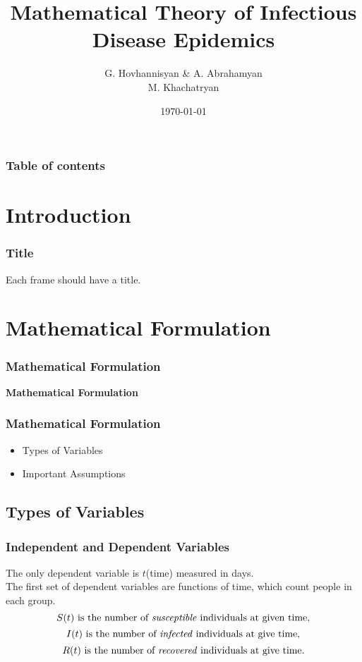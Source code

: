 \documentclass{beamer}
\begin{document}
\title{Mathematical Theory of Infectious Disease Epidemics}
\author{G. Hovhannisyan & A. Abrahamyan\\
M. Khachatryan}
\date{\today}


\begin{frame}
\titlepage
\end{frame}

\begin{frame}\frametitle{Table of contents}\tableofcontents
\end{frame}


\section{Introduction}
\begin{frame}\frametitle{Title}
\begin{center}
    Each frame should have a title.
\end{center}
\end{frame}


\section{Mathematical Formulation}
\begin{frame}\frametitle{Mathematical Formulation}
\begin{center}
    \textbf{Mathematical Formulation}
\end{center}
\end{frame}


\begin{frame}\frametitle{Mathematical Formulation}
\begin{itemize}
\item Types of Variables
\item Important Assumptions
\end{itemize}
\end{frame}

\subsection{Types of Variables}
\begin{frame}\frametitle{Independent and Dependent Variables}
    The only dependent variable is $t$(time) measured in days.\\
    \vspace{0.15in}
    The first set of dependent variables are functions of time, which count people in each group.
    $$S(t)\text{ is the number of \textit{susceptible} individuals at given time,}$$
    $$I(t)\text{ is the number of \textit{infected} individuals at give time,}$$
    $$R(t)\text{ is the number of \textit{recovered} individuals at give time.}$$
\end{frame}
\end{document}

